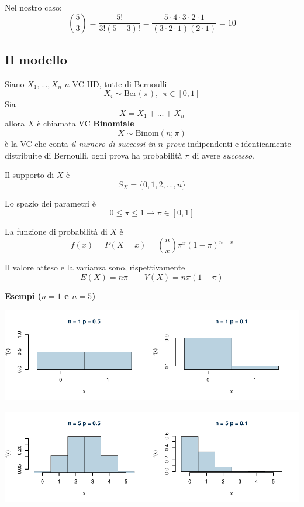 \documentclass[
  11pt,
]{book}
\theoremstyle{mytheoremstyle}
\theoremstyle{mydefstyle}
\begin{document}
Nel nostro caso:
\[\binom{5}{ 3}=\frac{5!}{3!(5-3)!}=\frac{5\cdot 4 \cdot 3\cdot 2\cdot 1}{(3\cdot 2\cdot 1)(2\cdot 1)}=10\]

\subsection{Il modello}\label{il-modello}

Siano \(X_1,...,X_n\) \(n\) VC IID, tutte di Bernoulli
\[
X_i\sim\text{Ber}(\pi), ~~\pi\in{[0,1]}
\]
Sia
\[
X=X_1+...+X_n
\]
allora \(X\) è chiamata VC \textbf{Binomiale}
\[X\sim\text{Binom}(n;\pi)
\]
è la VC che conta \emph{il numero di successi in \(n\) prove} indipendenti e identicamente distribuite di Bernoulli, ogni prova ha probabilità \(\pi\) di avere \emph{successo}.

Il supporto di \(X\) è
\[S_X=\{0,1,2,...,n\}\]

Lo spazio dei parametri è
\[0\leq\pi\leq 1 \rightarrow \pi\in[0,1]\]

La funzione di probabilità di \(X\) è
\[f(x)=P(X=x)=\binom{n}{ x}\pi^x(1-\pi)^{n-x} \]

Il valore atteso e la varianza sono, rispettivamente
\[E(X)=n\pi\qquad V(X)=n\pi(1-\pi)\]

\textbf{Esempi (\(n=1\) e \(n=5\))}

\begin{center}\includegraphics{Appunti_di_Statistica_2025_files/figure-latex/07a-Binomiale-1-1} \end{center}

\begin{center}\includegraphics{Appunti_di_Statistica_2025_files/figure-latex/07a-Binomiale-2-1} \end{center}
\end{document}
